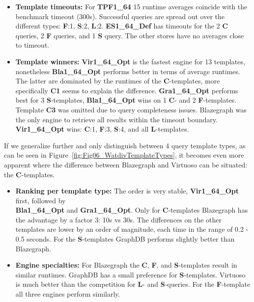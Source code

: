 \begin{itemize}
	\item \textbf{Template timeouts:} For \textbf{TPF1\_64} 15 runtime averages coincide with the benchmark timeout (300s). Successful queries are spread out over the different types: \textbf{F}:1, \textbf{S}:2, \textbf{L}:2.
	\textbf{ES1\_64\_Def} has timeouts for the 2 \textbf{C} queries,  2 \textbf{F} queries, and 1 \textbf{S} query. The other stores have no averages close to timeout.
	
	\item  \textbf{Template winners:} \textbf{Vir1\_64\_Opt} is the fastest engine for 13 templates, nonetheless \textbf{Bla1\_64\_Opt} performs better in terms of average runtimes. The latter are dominated by the runtimes of the \textbf{C}-templates, more specifically \textbf{C1} seems to explain the difference. 
	\textbf{Gra1\_64\_Opt} performs best for 3 \textbf{S}-templates, \textbf{Bla1\_64\_Opt} wins on 1 \textbf{C}- and 2 \textbf{F}-templates. Template \textbf{C3} was omitted due to query completeness issues. Blazegraph was the only engine to retrieve all results within the timeout boundary.
	\textbf{Vir1\_64\_Opt} wins: \textbf{C}:1, \textbf{F}:3, \textbf{S}:4, and all \textbf{L}-templates.
\end{itemize}

If we generalize further and only distinguish between 4 query template types, as can be seen in Figure~\ref{fig:Fig06_WatdivTemplateTypes}, it becomes even more apparent where the difference between Blazegraph and Virtuoso can be situated: the \textbf{C}-templates.
\begin{itemize}
	\item \textbf{Ranking per template type:} The order is very stable, \textbf{Vir1\_64\_Opt} first, followed by  \\ \textbf{Bla1\_64\_Opt} and \textbf{Gra1\_64\_Opt}. Only for \textbf{C}-templates Blazegraph has the advantage  by a factor 3: 10s vs 30s. The differences on the other templates are lower by an order of magnitude, each time in the range of 0.2 - 0.5 seconds. For the \textbf{S}-templates GraphDB performs slightly better than Blazegraph.
	\item \textbf{Engine specialties:} For Blazegraph the \textbf{C}, \textbf{F}, and \textbf{S}-templates result in similar runtimes. GraphDB has a small preference for \textbf{S}-templates. Virtuoso is much better than the competition for \textbf{L}- and \textbf{S}-queries. For the \textbf{F}-template all three engines perform similarly.
\end{itemize}

